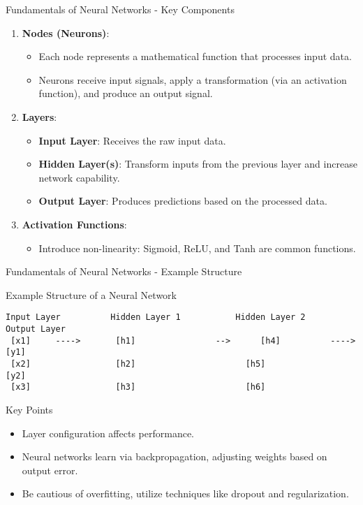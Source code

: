 \documentclass[aspectratio=169]{beamer}
\begin{document}
\begin{frame}[fragile]{Fundamentals of Neural Networks - Key Components}
    \begin{enumerate}
        \item \textbf{Nodes (Neurons)}:
            \begin{itemize}
                \item Each node represents a mathematical function that processes input data.
                \item Neurons receive input signals, apply a transformation (via an activation function), and produce an output signal.
            \end{itemize}

        \item \textbf{Layers}:
            \begin{itemize}
                \item \textbf{Input Layer}: Receives the raw input data.
                \item \textbf{Hidden Layer(s)}: Transform inputs from the previous layer and increase network capability.
                \item \textbf{Output Layer}: Produces predictions based on the processed data.
            \end{itemize}

        \item \textbf{Activation Functions}:
            \begin{itemize}
                \item Introduce non-linearity: Sigmoid, ReLU, and Tanh are common functions.
            \end{itemize}
    \end{enumerate}
\end{frame}

\begin{frame}[fragile]{Fundamentals of Neural Networks - Example Structure}
    \begin{block}{Example Structure of a Neural Network}
        \begin{verbatim}
Input Layer          Hidden Layer 1           Hidden Layer 2        Output Layer
 [x1]     ---->       [h1]                -->      [h4]          ----> [y1]
 [x2]                 [h2]                      [h5]               [y2]
 [x3]                 [h3]                      [h6]
        \end{verbatim}
    \end{block}

    \begin{block}{Key Points}
        \begin{itemize}
            \item Layer configuration affects performance.
            \item Neural networks learn via backpropagation, adjusting weights based on output error.
            \item Be cautious of overfitting, utilize techniques like dropout and regularization.
        \end{itemize}
    \end{block}
\end{frame}
\end{document}

